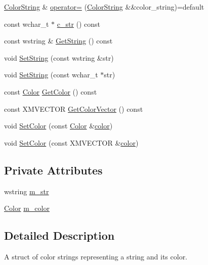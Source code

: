 \begin{DoxyCompactItemize}
\item 
\hyperlink{structmage_1_1_color_string}{Color\+String} \& \hyperlink{structmage_1_1_color_string_a2016416ce91bb7e94a8869201db47ef1}{operator=} (\hyperlink{structmage_1_1_color_string}{Color\+String} \&\&color\+\_\+string)=default
\item 
const wchar\+\_\+t $\ast$ \hyperlink{structmage_1_1_color_string_a7de3a01551299c0df363adf0e8ecc304}{c\+\_\+str} () const
\item 
const wstring \& \hyperlink{structmage_1_1_color_string_a9789c8bfac1667f0ee624351c45b2177}{Get\+String} () const
\item 
void \hyperlink{structmage_1_1_color_string_aa5ec8bb8e44683ed8a88534f04639930}{Set\+String} (const wstring \&str)
\item 
void \hyperlink{structmage_1_1_color_string_a317caadad725b67ede68f1e474e47d3b}{Set\+String} (const wchar\+\_\+t $\ast$str)
\item 
const \hyperlink{structmage_1_1_color}{Color} \hyperlink{structmage_1_1_color_string_a4bb550545996322face2c6c76787b861}{Get\+Color} () const
\item 
const X\+M\+V\+E\+C\+T\+OR \hyperlink{structmage_1_1_color_string_a373ca6121d99156daa4aa636920d0cc2}{Get\+Color\+Vector} () const
\item 
void \hyperlink{structmage_1_1_color_string_a918e5ad68ed9f64fabeaf1b5d443ea42}{Set\+Color} (const \hyperlink{structmage_1_1_color}{Color} \&\hyperlink{namespacemage_a56eceea5a9bceb2b56073f3ea4945781}{color})
\item 
void \hyperlink{structmage_1_1_color_string_ae8dec067c38d4a395232a987b444aebc}{Set\+Color} (const X\+M\+V\+E\+C\+T\+OR \&\hyperlink{namespacemage_a56eceea5a9bceb2b56073f3ea4945781}{color})
\end{DoxyCompactItemize}
\subsection*{Private Attributes}
\begin{DoxyCompactItemize}
\item 
wstring \hyperlink{structmage_1_1_color_string_a9eb840afa5112cd611f5bb1b21edc045}{m\+\_\+str}
\item 
\hyperlink{structmage_1_1_color}{Color} \hyperlink{structmage_1_1_color_string_a3f351c61281fc49786bc13842527d2a3}{m\+\_\+color}
\end{DoxyCompactItemize}


\subsection{Detailed Description}
A struct of color strings representing a string and its color. 

